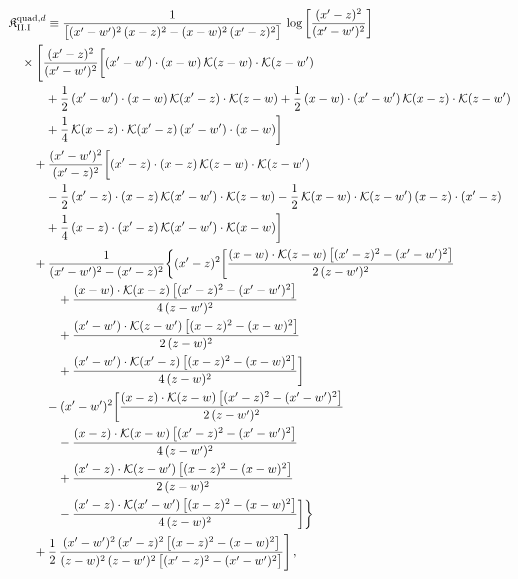 \begingroup\small
\begin{align}\label{eq:K-rm_quad_d_rm_II_I}
&\mathfrak{K}^{{\rm quad},d}_{\rm II.I}\equiv \frac{1}{\big[(x'-w')^{2}\,(x-z)^{2}-(x-w)^{2}\,(x'-z)^{2}\big]}\, \log\left[\frac{(x'-z)^{2}}{(x'-w')^{2}}\right]\notag\\
&\quad \times\Bigg[\frac{(x'-z)^{2}}{(x'-w')^{2}}\bigg[(x'-w')\cdot(x-w)\, \mathcal{K}(z-w)\cdot\mathcal{K}(z-w')\notag\\
&\quad\quad\quad +\frac{1}{2}\, (x'-w')\cdot(x-w)\, \mathcal{K}(x'-z)\cdot\mathcal{K}(z-w) +\frac{1}{2}\, (x-w)\cdot(x'-w')\, \mathcal{K}(x-z)\cdot\mathcal{K}(z-w')\notag\\
&\quad\quad\quad +\frac{1}{4}\, \mathcal{K}(x-z)\cdot\mathcal{K}(x'-z)\, (x'-w')\cdot(x-w)\bigg]\notag\\
&\quad\quad +\frac{(x'-w')^{2}}{(x'-z)^{2}}\bigg[(x'-z)\cdot(x-z)\, \mathcal{K}(z-w)\cdot\mathcal{K}(z-w')\notag\\
&\quad\quad\quad -\frac{1}{2}\, (x'-z)\cdot(x-z)\, \mathcal{K}(x'-w')\cdot\mathcal{K}(z-w) -\frac{1}{2}\, \mathcal{K}(x-w)\cdot\mathcal{K}(z-w')\, (x-z)\cdot(x'-z)\notag\\
&\quad\quad\quad +\frac{1}{4}\, (x-z)\cdot(x'-z)\, \mathcal{K}(x'-w')\cdot\mathcal{K}(x-w)\bigg]\notag\\
&\quad\quad +\frac{1}{(x'-w')^{2}-(x'-z)^{2}}\bigg\{(x'-z)^{2}\bigg[\frac{(x-w)\cdot\mathcal{K}(z-w)\,\big[(x'-z)^{2}-(x'-w')^{2}\big]}{2\,(z-w')^{2}}\notag\\
&\quad\quad\quad\quad +\frac{(x-w)\cdot\mathcal{K}(x-z)\,\big[(x'-z)^{2}-(x'-w')^{2}\big]}{4\,(z-w')^{2}}\notag\\
&\quad\quad\quad\quad +\frac{(x'-w')\cdot\mathcal{K}(z-w')\,\big[(x-z)^{2}-(x-w)^{2}\big]}{2\,(z-w)^{2}}\notag\\
&\quad\quad\quad\quad +\frac{(x'-w')\cdot\mathcal{K}(x'-z)\,\big[(x-z)^{2}-(x-w)^{2}\big]}{4\,(z-w)^{2}}\bigg]\notag\\
&\quad\quad\quad -(x'-w')^{2}\bigg[\frac{(x-z)\cdot\mathcal{K}(z-w)\,\big[(x'-z)^{2}-(x'-w')^{2}\big]}{2\,(z-w')^{2}}\notag\\
&\quad\quad\quad\quad -\frac{(x-z)\cdot\mathcal{K}(x-w)\,\big[(x'-z)^{2}-(x'-w')^{2}\big]}{4\,(z-w')^{2}}\notag\\
&\quad\quad\quad\quad +\frac{(x'-z)\cdot\mathcal{K}(z-w')\,\big[(x-z)^{2}-(x-w)^{2}\big]}{2\,(z-w)^{2}}\notag\\
&\quad\quad\quad\quad -\frac{(x'-z)\cdot\mathcal{K}(x'-w')\,\big[(x-z)^{2}-(x-w)^{2}\big]}{4\,(z-w)^{2}}\bigg]\bigg\}\notag\\
&\quad\quad +\frac{1}{2}\, \frac{(x'-w')^{2}\,(x'-z)^{2}\,\big[(x-z)^{2}-(x-w)^{2}\big]}{(z-w)^{2}\,(z-w')^{2}\,\big[(x'-z)^{2}-(x'-w')^{2}\big]}\Bigg]\,,
\end{align}
\endgroup
